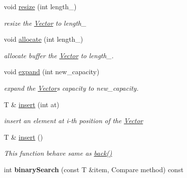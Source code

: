 \begin{DoxyCompactItemize}
\item 
void \hyperlink{class_i_dream_sky_1_1_vector_aee1b78ffb3522750babb05a1ef96f027}{resize} (int length\+\_\+)
\begin{DoxyCompactList}\small\item\em resize the \hyperlink{class_i_dream_sky_1_1_vector}{Vector} to length\+\_\+ \end{DoxyCompactList}\item 
void \hyperlink{class_i_dream_sky_1_1_vector_a0f3310762a1ae0eb95e040caeaa7db85}{allocate} (int length\+\_\+)
\begin{DoxyCompactList}\small\item\em allocate buffer the \hyperlink{class_i_dream_sky_1_1_vector}{Vector} to length\+\_\+. \end{DoxyCompactList}\item 
void \hyperlink{class_i_dream_sky_1_1_vector_af0a2ae2d86855fbab5376e1391c56a91}{expand} (int new\+\_\+capacity)
\begin{DoxyCompactList}\small\item\em expand the \hyperlink{class_i_dream_sky_1_1_vector}{Vector}\textquotesingle{}s capacity to new\+\_\+capacity. \end{DoxyCompactList}\item 
T \& \hyperlink{class_i_dream_sky_1_1_vector_a0db13e0805dd3c7ae673dedc58f7a046}{insert} (int at)
\begin{DoxyCompactList}\small\item\em insert an element at i-\/th position of the \hyperlink{class_i_dream_sky_1_1_vector}{Vector} \end{DoxyCompactList}\item 
T \& \hyperlink{class_i_dream_sky_1_1_vector_a2b6c89314177de6f83ff31ade0247a6a}{insert} ()
\begin{DoxyCompactList}\small\item\em This function behave same as \hyperlink{class_i_dream_sky_1_1_vector_a12b1b598f7e96440dc154413c6dbd2b7}{back()} \end{DoxyCompactList}\item 
int {\bfseries binary\+Search} (const T \&item, Compare method) const \hypertarget{class_i_dream_sky_1_1_vector_a6f82569f15b8563e4768c95137f186c1}{}\label{class_i_dream_sky_1_1_vector_a6f82569f15b8563e4768c95137f186c1}


\end{DoxyCompactItemize}
